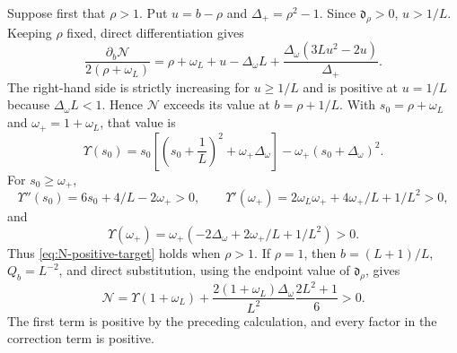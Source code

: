 \documentclass[12pt,anonymous]{iopjournal}
\numberwithin{equation}{section}
\theoremstyle{remark}
\begin{document}
Suppose first that \(\rho>1\).  Put \(u=b-\rho\) and
\(\Delta_+=\rho^2-1\).  Since \(\mathfrak d_\rho>0\), \(u>1/L\).
Keeping \(\rho\) fixed,
direct differentiation gives
\[
 \frac{\partial_b\mathcal N}{2(\rho+\omega_L)}
 =\rho+\omega_L+u-\Delta_\omega L
 +\frac{\Delta_\omega(3Lu^2-2u)}{\Delta_+}.
\]
The right-hand side is strictly increasing for \(u\geq1/L\) and is positive
at \(u=1/L\) because \(\Delta_\omega L<1\).  Hence \(\mathcal N\) exceeds
its value at
\(b=\rho+1/L\).  With
\(s_0=\rho+\omega_L\) and \(\omega_+=1+\omega_L\), that value is
\[
 \Upsilon(s_0)
 =s_0\left[\left(s_0+\frac1L\right)^2+\omega_+\Delta_\omega\right]
 -\omega_+(s_0+\Delta_\omega)^2.
\]
For \(s_0\geq\omega_+\),
\[
 \Upsilon''(s_0)=6s_0+4/L-2\omega_+>0,\qquad
 \Upsilon'(\omega_+)=2\omega_L\omega_++4\omega_+/L+1/L^2>0,
\]
and
\[
 \Upsilon(\omega_+)
 =\omega_+(-2\Delta_\omega+2\omega_+/L+1/L^2)>0.
\]
Thus \eqref{eq:N-positive-target} holds when \(\rho>1\).  If \(\rho=1\),
then \(b=(L+1)/L\), \(Q_b=L^{-2}\), and direct substitution, using the
endpoint value of \(\mathfrak d_\rho\), gives
\[
 \mathcal N=\Upsilon(1+\omega_L)
 +\frac{2(1+\omega_L)\Delta_\omega}{L^2}
   \frac{2L^2+1}{6}>0.
\]
The first term is positive by the preceding calculation, and every factor
in the correction term is positive.
\end{document}
